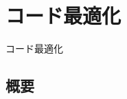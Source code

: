 \documentclass[dvipdfmx]{beamer}
\begin{document}





 
 
 
 
 
 






\section{コード最適化}

\begin{frame}
  \begin{center}
  {\Huge コード最適化}
  \end{center}
\end{frame}

\subsection{概要}
\end{document}
